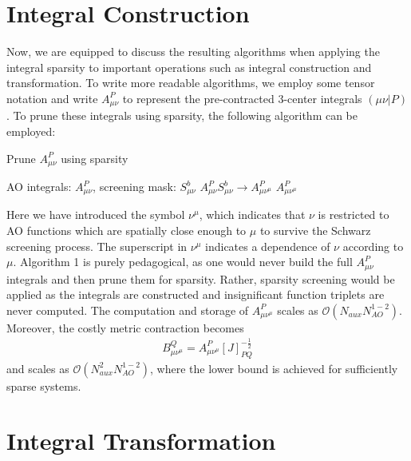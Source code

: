 \section{Integral Construction}

Now, we are equipped to discuss the resulting algorithms when applying the integral sparsity to important operations such as
integral construction and transformation. To write more readable algorithms, 
we employ some tensor notation and write $A_{\mu \nu}^P$ to represent
the pre-contracted 3-center integrals $(\mu \nu |P)$. To prune these integrals using sparsity, 
the following algorithm can be employed:

\begin{algorithm}
\caption{Prune $A_{\mu \nu}^P$ using sparsity}
\begin{algorithmic}
\REQUIRE AO integrals: $A_{\mu \nu}^P$, screening mask: $S_{\mu \nu}^b$
    \STATE $A_{\mu \nu}^P S_{\mu \nu}^b \rightarrow A_{\mu \nu^{\mu}}^P$
\ENDFOR
\RETURN $A_{\mu \nu^\mu}^P$
\end{algorithmic}
\end{algorithm}

\noindent Here we have introduced the symbol $\nu^\mu$, which indicates that $\nu$ is restricted to AO functions
which are spatially close enough to $\mu$ to survive the Schwarz screening process. The superscript in $\nu^\mu$ 
indicates a dependence of $\nu$ according to $\mu$. Algorithm 1 is purely pedagogical, as one would never
build the full $A_{\mu \nu}^P$ integrals and then prune them for sparsity. 
Rather, sparsity screening would be applied as the integrals are constructed and insignificant
function triplets are never computed. The computation
and storage of $A_{\mu \nu^\mu}^P$ scales as $\mathcal{O}(N_{aux}N_{AO}^{1-2})$. 
Moreover, the costly metric contraction becomes
\begin{align} 
B_{\mu \nu^\mu}^Q = A_{\mu \nu^\mu}^P[J]_{PQ}^{-\frac{1}{2}}
\end{align}
\noindent and scales as $\mathcal{O}(N_{aux}^2N_{AO}^{1-2})$, where the lower bound is achieved for sufficiently sparse
systems.

\section{Integral Transformation}

